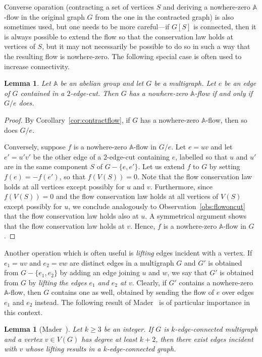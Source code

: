 \documentclass[12pt,twoside,openright,a4paper]{book}
\newtheorem{lemma}[theorem]{Lemma}
\begin{document}
Converse oparation (contracting a set of vertices $S$ and deriving a nowhere-zero $\mathbb{A}$-flow in the original graph $G$ from the one
in the contracted graph) is also sometimes used, but one needs to be more careful---if $G[S]$ is connected, then it is always possible
to extend the flow so that the conservation law holds at vertices of $S$, but it may not necessarily be possible to do so in such a way
that the resulting flow is nowhere-zero.  The following special case is often used to increase connectivity.
\begin{lemma}\label{lemma:contr2ecflow}
Let $\mathbb{A}$ be an abelian group and let $G$ be a multigraph.  Let $e$ be an edge of $G$ contained in a $2$-edge-cut.
Then $G$ has a nowhere-zero $\mathbb{A}$-flow if and only if $G/e$ does.
\end{lemma}
\begin{proof}
By Corollary~\ref{cor:contractflow}, if $G$ has a nowhere-zero $\mathbb{A}$-flow, then so does $G/e$.

Conversely, suppose $f$ is a nowhere-zero $\mathbb{A}$-flow in $G/e$.  Let $e=uv$ and let $e'=u'v'$ be the other edge of a $2$-edge-cut
containing $e$, labelled so that $u$ and $u'$ are in the same component $S$ of $G-\{e,e'\}$.  Let us extend $f$ to $G$
by setting $f(e)=-f(e')$, so that $f(V(S))=0$.
Note that the flow conservation law holds at all vertices except possibly for $u$ and $v$.
Furthermore, since $f(V(S))=0$ and the flow conservation law holds at all vertices of $V(S)$ except possibly for $u$,
we conclude analogously to Observation~\ref{obs:flowoncut} that the flow conservation law holds also at $u$.  A symmetrical
argument shows that the flow conservation law holds at $v$.  Hence, $f$ is a nowhere-zero $\mathbb{A}$-flow in $G$.
\end{proof}

Another operation which is often useful is \emph{lifting} edges incident with a vertex.  If $e_1=uv$ and $e_2=vw$ are distinct edges
in a multigraph $G$ and $G'$ is obtained from $G-\{e_1,e_2\}$ by adding an edge joining $u$ and $w$, we say that $G'$ is obtained
from $G$ by \emph{lifting the edges $e_1$ and $e_2$ at $v$}.  Clearly, if $G'$ contains a nowhere-zero $\mathbb{A}$-flow,
then $G$ contains one as well, obtained by sending the flow of $e$ over edges $e_1$ and $e_2$ instead.
The following result of Mader~\cite{mader} is of particular importance in this context.
\begin{lemma}[Mader~\cite{mader}]\label{lemma:mader}
Let $k\ge 3$ be an integer.  If $G$ is $k$-edge-connected multigraph and a vertex $v\in V(G)$ has
degree at least $k+2$, then there exist edges incident with $v$ whose lifting results in a $k$-edge-connected graph.
\end{lemma}
\end{document}
